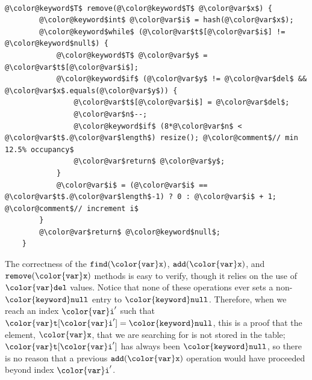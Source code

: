 \documentclass[10pt]{book}
\theoremstyle{plain}
\theoremstyle{definition}
\begin{document}
 \ \vspace{.5ex}\begin{Verbatim}[gobble=1,tabsize=2,frame=single,framerule=1.2pt,commandchars=\\@\$,label=\texttt{LinearHashTable},labelposition=topline]
	@\color@keyword$T$ remove(@\color@keyword$T$ @\color@var$x$) {
		@\color@keyword$int$ @\color@var$i$ = hash(@\color@var$x$);
		@\color@keyword$while$ (@\color@var$t$[@\color@var$i$] != @\color@keyword$null$) {
			@\color@keyword$T$ @\color@var$y$ = @\color@var$t$[@\color@var$i$];
			@\color@keyword$if$ (@\color@var$y$ != @\color@var$del$ && @\color@var$x$.equals(@\color@var$y$)) { 
				@\color@var$t$[@\color@var$i$] = @\color@var$del$;
				@\color@var$n$--;
				@\color@keyword$if$ (8*@\color@var$n$ < @\color@var$t$.@\color@var$length$) resize(); @\color@comment$// min 12.5% occupancy$
				@\color@var$return$ @\color@var$y$;
			}
			@\color@var$i$ = (@\color@var$i$ == @\color@var$t$.@\color@var$length$-1) ? 0 : @\color@var$i$ + 1;  @\color@comment$// increment i$
		}
		@\color@var$return$ @\color@keyword$null$;
	}
\end{Verbatim}


The correctness of the \ensuremath{\mathtt{find({\color{var}x})}}, \ensuremath{\mathtt{add({\color{var}x})}}, and \ensuremath{\mathtt{remove({\color{var}x})}} methods is
easy to verify, though it relies on the use of \ensuremath{\mathtt{{\color{var}del}}} values.  Notice
that none of these operations ever sets a non-\ensuremath{\mathtt{{\color{keyword}null}}} entry to \ensuremath{\mathtt{{\color{keyword}null}}}.
Therefore, when we reach an index \ensuremath{\mathtt{{\color{var}i}'}} such that \ensuremath{\mathtt{{\color{var}t}[{\color{var}i}']={\color{keyword}null}}}, this is
a proof that the element, \ensuremath{\mathtt{{\color{var}x}}}, that we are searching for is not stored
in the table; \ensuremath{\mathtt{{\color{var}t}[{\color{var}i}']}} has always been \ensuremath{\mathtt{{\color{keyword}null}}}, so there is no reason that
a previous \ensuremath{\mathtt{add({\color{var}x})}} operation would have proceeded beyond index \ensuremath{\mathtt{{\color{var}i}'}}.
\end{document}
